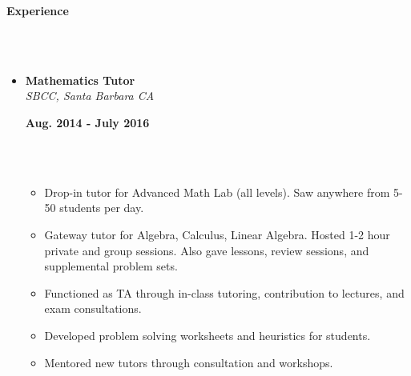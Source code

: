 \documentclass[a4paper,11pt]{article}
\newcommand{\isep}{-2 pt}
\newcommand{\lsep}{-0.2cm}
\newcommand{\resheading}[1]{{\small \colorbox{mygrey}{\begin{minipage}{0.975\textwidth}{\textbf{#1 \vphantom{p\^{E}}}}\end{minipage}}}}
\newcommand{\workexp}[4]{
\begin{minipage}[t]{7cm}
\begin{flushleft}
\textbf{#1} \\
\indent \emph{#2}\\
\end{flushleft}
\end{minipage}
\hfill
\begin{minipage}[t]{7cm}
\begin{flushright}
\textbf{#3} \\
\indent #4 \\
\end{flushright}
\end{minipage}
}
\begin{document}



\resheading{\textbf{Experience} }\\[\lsep]
\\[-0.5cm]
\begin{itemize}
\item 
\workexp{Mathematics Tutor}{SBCC, Santa Barbara CA}{Aug. 2014 - July 2016}{}
\\[-0.3cm]
	\begin{itemize}\itemsep \isep
	\item Drop-in tutor for Advanced Math Lab (all levels). Saw anywhere from 5-50 students per day.
	\item Gateway tutor for Algebra, Calculus, Linear Algebra. Hosted 1-2 hour private and group sessions. Also gave lessons, review sessions, and supplemental problem sets.
	\item Functioned as TA through in-class tutoring, contribution to lectures, and exam consultations.
	\item Developed problem solving worksheets and heuristics for students.
	\item Mentored new tutors through consultation and workshops.
	\end{itemize}


\end{itemize}
\end{document}
